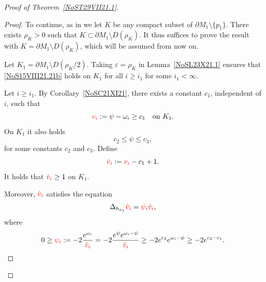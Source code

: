 \documentclass[10pt,a4paper]{article}
\numberwithin{equation}{section}
\newcommand{\mv}{\omega}%
\newcommand{\red}[1]{{\color{red}#1}}
\newcommand{\repsilon}{ {\varepsilon}}
\begin{document}
\begin{proof}[Proof of Theorem~\ref{NoST29VII21.1}]
\begin{proof}
To continue, as in \cite{CDW} we let $K$ be any compact subset of $\partial M_1\setminus \{p_1\}$. There exists $\rho_K>0$ such that $K\subset \partial M_1\setminus D(\rho_K)$. It thus suffices to prove the result with $ K=\partial M_1\setminus D(\rho_K)$, which will be assumed from now on.

Let $K_1 = \partial M_1\setminus D(\rho_K/2)$. Taking $\repsilon=\rho_K $ in Lemma~\ref{NoSL23X21.1} ensures that \eqref{NoS15VIII21.21b} holds on $K_1$ for all $i\ge i_1 $ for some $i_1<\infty$.

Let $i\ge i_1$. By Corollary~\ref{NoSC21XI21},
there exists a constant $c_1$, independent of $i$, such that
\begin{equation*}%
\red{v_i}:=\psi -\mv_i \ge c_1 \quad \text{on} \ K_1.
\end{equation*}
On $K_1$ it also holds
\begin{equation}\label{NoS24X21.1b}
 c_2 \le \psi \le c_3,
\end{equation}
for some constants $c_2$ and $c_3$.
Define
\[
 \red{\hat v_i} : = \red{v_i} -c_1 +1.
\]
It holds that $\red{\hat v_i} \ge 1$ on $K_1$.

Moreover, $\red{\hat v_i}$ satisfies the equation
\begin{equation*}%
 \Delta_{ h_{\kappa_1}} \red{\hat v_i} = \red{\psi_i}\red{\hat v_i},
\end{equation*}
where
\begin{equation*}%
0 \ge \red{\psi_i} : =- 2 \frac{{\rm e}^{\mv_i}}{ \red{\hat v_i}}
 =- 2 \frac{{\rm e}^\psi {\rm e}^{\mv_i-\psi }}{ \red{\hat v_i}}
\ge - 2 {\rm e}^{c_3} {\rm e}^{\mv_i-\psi }
 \ge -2 {\rm e}^{c_3-c_1}.
\end{equation*}


\end{proof}
\end{proof}
\end{document}

